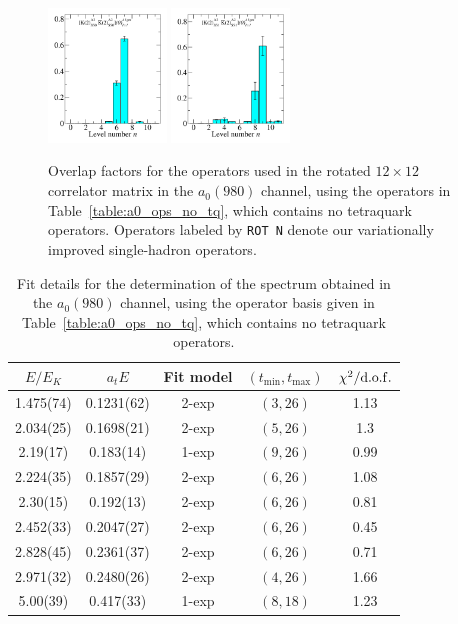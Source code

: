 \begin{figure}
  \includegraphics[width=0.28\textwidth]{figures/spectrum_a1gm/no_tq/zfactors/zfactor_isotriplet_kaon_kbar-A1gm_1-P011-A2-SS_0-P0-1-1-A2-SS_0.pdf}
  \includegraphics[width=0.28\textwidth]{figures/spectrum_a1gm/no_tq/zfactors/zfactor_isotriplet_kaon_kbar-A1gm_1-P011-A2-SS_1-P0-1-1-A2-SS_1.pdf}
  \cprotect\caption[Overlap factors for the operators used in the rotated $12\times 12$ correlator matrix in the $a_0(980)$ channel, using the operators in Table~\ref{table:a0_ops_no_tq}, which contains no tetraquark operators.]{Overlap factors for the operators used in the rotated $12\times 12$ correlator matrix in the $a_0(980)$ channel, using the operators in Table~\ref{table:a0_ops_no_tq}, which contains no tetraquark operators. Operators labeled by \verb+ROT N+ denote our variationally improved single-hadron operators.}
  \label{fig:a0_no_tq_zfactors}
\end{figure}

\begin{table}
  \centering
  \begin{tabular}{c|c|c|c|c}
    $E / E_K$ & $a_t E$ & Fit model & $(t_{\mathrm{min}}, {t_\mathrm{max}})$ & $\chi^2 / \rm{d.o.f.}$\\
    \hline
    1.475(74)&0.1231(62)&2{-}exp&$(3, 26)$&1.13\\
    2.034(25)&0.1698(21)&2{-}exp&$(5, 26)$&1.3\\
    2.19(17)&0.183(14)&1{-}exp&$(9, 26)$&0.99\\
    2.224(35)&0.1857(29)&2{-}exp&$(6, 26)$&1.08\\
    2.30(15)&0.192(13)&2{-}exp&$(6, 26)$&0.81\\
    2.452(33)&0.2047(27)&2{-}exp&$(6, 26)$&0.45\\
    2.828(45)&0.2361(37)&2{-}exp&$(6, 26)$&0.71\\
    2.971(32)&0.2480(26)&2{-}exp&$(4, 26)$&1.66\\
    5.00(39)&0.417(33)&1{-}exp&$(8, 18)$&1.23
  \end{tabular}
  \caption{Fit details for the determination of the spectrum obtained in the $a_0(980)$ channel, using the operator basis given in Table~\ref{table:a0_ops_no_tq}, which contains no tetraquark operators.}
  \label{table:a0_no_tq_spectrum}
\end{table}

